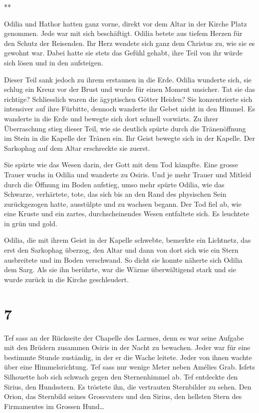 \documentclass[11pt,titlepage,a5paper]{book}
\newcommand{\sterne}{\par{\centering ***\par}}
\begin{document}
\sterne

Odilia und Hathor hatten ganz vorne, direkt vor dem Altar in der Kirche Platz genommen. Jede war mit sich beschäftigt. Odilia betete aus tiefem Herzen für den Schutz der Reisenden. Ihr Herz wendete sich ganz dem Christus zu, wie sie es gewohnt war. Dabei hatte sie stets das Gefühl gehabt, ihre Teil von ihr würde sich lösen und in den aufsteigen. 

Dieser Teil sank jedoch zu ihrem erstaunen in die Erde. Odilia wunderte sich, sie schlug ein Kreuz vor der Brust und wurde für einen Moment unsicher. Tat sie das richtige? Schliesslich waren die ägyptischen Götter Heiden? Sie konzentrierte sich intensiver auf ihre Fürbitte, dennoch wanderte ihr Gebet nicht in den Himmel. Es wanderte in die Erde und bewegte sich dort schnell vorwärts. Zu ihrer Überraschung stieg dieser Teil, wie sie deutlich spürte durch die Tränenöffnung im Stein in die Kapelle der Tränen ein. Ihr Geist bewegte sich in der Kapelle. Der Sarkophag auf dem Altar erschreckte sie zuerst. 

Sie spürte wie das Wesen darin, der Gott mit dem Tod kämpfte. Eine grosse Trauer wuchs in Odilia und wanderte zu Osiris. Und je mehr Trauer und Mitleid durch die Öffnung im Boden aufstieg, umso mehr spürte Odilia, wie das Schwarze, verhärtete, tote, das sich bis an den Rand des physischen Sein zurückgezogen hatte, ausstülpte und zu wachsen begann. Der Tod fiel ab, wie eine Kruste und ein zartes, durchscheinendes Wesen entfaltete sich. Es leuchtete in grün und gold.

Odilia, die mit ihrem Geist in der Kapelle schwebte, bemerkte ein Lichtnetz, das erst den Sarkophag überzog, den Altar und dann von dort sich wie ein Stern ausbreitete und im Boden verschwand. So dicht sie konnte näherte sich Odilia dem Sarg.  Als sie ihn berührte, war die Wärme überwältigend stark und sie wurde zurück in die Kirche geschleudert.

\section*{7}

Tef sass an der Rückseite der Chapelle des Larmes, denn es war seine Aufgabe mit den Brüdern zusammen Osiris in der Nacht zu bewachen. Jeder war für eine bestimmte Stunde zuständig, in der er die Wache leitete. Jeder von ihnen wachte über eine Himmelsrichtung. Tef sass nur wenige Meter neben Amélies Grab. Isfets Silhouette hob sich schwach gegen den Sternenhimmel ab. Tef entdeckte den Sirius, den Hundsstern. Es tröstete ihn, die vertrauten Sternbilder zu sehen. Den Orion, das Sternbild seines Grossvaters und den Sirius, den hellsten Stern des Firmamentes im Grossen Hund\dots
\end{document}
